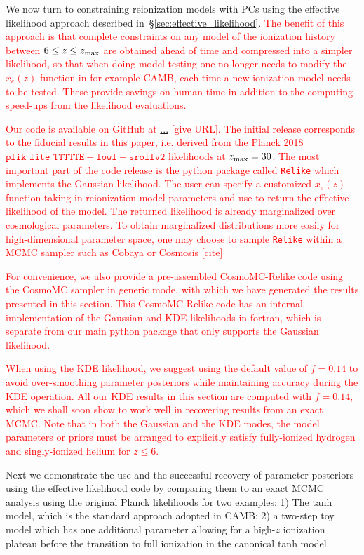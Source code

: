 \documentclass[prd,twocolumn,amsmath,amssymb,floatfix,superscriptaddress,nofootinbib]{revtex4-1}
\newcommand{\zmax}{z_{\rm max}}
\newcommand{\ch}[1]{\textcolor{red}{#1}}
\begin{document}
We now turn to constraining reionization models with PCs using the
effective likelihood approach described in~\S\ref{sec:effective_likelihood}.  \ch{The benefit of this approach is that
complete constraints on any model of the ionization history  between $6 \leq z \leq \zmax$ are obtained ahead of time and compressed into a simpler likelihood, so that when doing model testing one no longer needs to modify the $x_e(z)$ function in for example CAMB, each time a new ionization model needs to be tested. These provide savings on human time in addition to the computing speed-ups from the likelihood evaluations.}

\ch{Our code is available on GitHub at \url{...} [give URL]. 
The initial release corresponds to the fiducial results in this paper, i.e. derived from the Planck 2018 $\texttt{plik\_lite\_TTTTTE} + \texttt{lowl} + \texttt{srollv2}$ likelihoods at $\zmax = 30$. 
The most important part of the code release is the python package called \texttt{Relike} which implements the Gaussian likelihood. The user can specify a customized $x_e(z)$ function taking in reionization model parameters and use \textt{Relike} to return the effective likelihood of the model. The returned likelihood is already marginalized over cosmological parameters. 
To obtain marginalized distributions more easily for high-dimensional parameter space, one may choose to sample \texttt{Relike} within a MCMC sampler such as Cobaya or Cosmosis \ch{[cite]}}

\ch{For convenience, we also provide a pre-assembled CosmoMC-Relike code using the CosmoMC sampler in generic mode, with which we have generated the results presented in this section. This CosmoMC-Relike code has an internal  implementation of the Gaussian and KDE likelihoods in fortran, which is separate from our main python package that only supports the Gaussian likelihood. }

\ch{When using the KDE likelihood, we suggest using the default value of $f = 0.14$ to avoid over-smoothing parameter posteriors while maintaining accuracy during the KDE operation. All our KDE results in this section are computed with $f = 0.14$, which we shall soon show to work well in recovering results from an exact MCMC. Note that in both the Gaussian and the KDE modes, the model parameters or priors must be arranged to explicitly satisfy fully-ionized hydrogen and singly-ionized helium for $z\leq 6$. }

Next we demonstrate the use and the successful recovery of parameter posteriors using the effective likelihood code by comparing them to an exact MCMC analysis using the original Planck likelihoods for two examples: 1) The tanh model, which is the standard approach adopted in CAMB; 2) a two-step toy model which has one additional parameter allowing for a high-$z$ ionization plateau before the transition to full ionization in the canonical tanh model.
\end{document}
